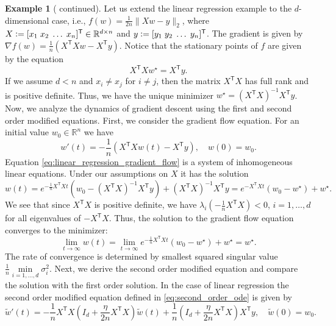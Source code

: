 \documentclass[12pt]{article}
\theoremstyle{definition}
\newtheorem{example}[example]{Example}
\numberwithin{equation}{section}
\newcommand{\R}{\mathbb{R}}
\newcommand{\T}{\mathsf{T}}
\newcommand{\norm}[1]{\lVert{#1}\rVert_2}
\newcommand{\defeq}{\vcentcolon=}
\begin{document}
\begin{example}[ continued]
  Let us extend the linear regression example to the $d$-dimensional case, i.e., $f(w)=\frac{1}{2n} \norm{Xw - y}$, where $X \defeq [x_1\;x_2\;\dots\;x_n]^\T \in \R^{d \times n}$ and $y \defeq [y_1\;y_2\;\dots\;y_n]^\T$. 
  The gradient is given by $\nabla f(w) = \frac{1}{n}\left(X^\T Xw - X^\T y\right)$. 
  Notice that the stationary points of $f$ are given by the equation
  \begin{equation*}
    X^\T Xw^\star = X^\T y.
  \end{equation*}
  If we assume $d < n$ and $x_i \neq x_j$ for $i \neq j$, then the matrix $X^\T X$ has full rank and is positive definite. Thus, we have the unique minimizer $w^\star = (X^\T X)^{-1}X^\T y$.
  Now, we analyze the dynamics of gradient descent using the first and second order modified equations. First, we consider the gradient flow equation.
  For an initial value $w_0 \in \R^n$ we have 
  \begin{equation}
    \label{eq:linear_regression_gradient_flow}
    w'(t) = -\frac{1}{n}\left(X^\T Xw(t) - X^\T y\right), \quad w(0) = w_0.
  \end{equation}
  Equation \eqref{eq:linear_regression_gradient_flow} is a system of inhomogeneous linear equations. Under our assumptions on $X$ it has the solution
  \begin{equation*}
    w(t) = e^{-\frac{1}{n}X^\T Xt}(w_0 - (X^\T X)^{-1}X^\T y) + (X^\T X)^{-1}X^\T y = e^{-X^\T Xt}(w_0 - w^\star) + w^\star.
  \end{equation*}
  We see that since $X^\T X$ is positive definite, we have $\lambda_i(-\frac{1}{n}X^\T X) < 0$, $i = 1, \dots, d$ for all eigenvalues of $-X^\T X$. Thus, the solution to the gradient flow equation converges to the minimizer:
  \begin{equation*}
    \lim_{t \rightarrow \infty} w(t) = \lim_{t \rightarrow \infty} e^{-\frac{1}{n}X^\T Xt}(w_0 - w^\star) + w^\star = w^\star.
  \end{equation*}
  The rate of convergence is determined by smallest squared singular value $\frac{1}{n}\min\limits_{i=1,\dots,d}\sigma_i^2$. Next, we derive the second order modified equation and compare the solution with the first order solution. In the case of linear regression the second order modified equation defined in \eqref{eq:second_order_ode} is given by
  \begin{equation*}
    \widetilde{w}'(t) = -\frac{1}{n}X^\T X \left(I_d + \frac{\eta}{2n}X^\T X\right)\widetilde{w}(t) + \frac{1}{n}\left(I_d + \frac{\eta}{2n} X^\T X\right)X^\T y, \quad \widetilde{w}(0) = w_0.

\end{equation*}
\end{example}
\end{document}

